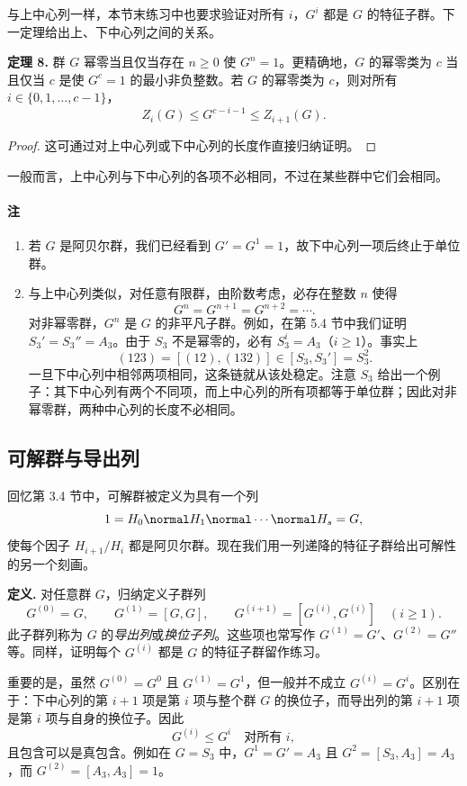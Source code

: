 与上中心列一样，本节末练习中也要求验证对所有 $i$，$G^i$ 都是 $G$ 的特征子群。下一定理给出上、下中心列之间的关系。

\medskip
\noindent\textbf{定理 8.} 群 $G$ 幂零当且仅当存在 $n\geq 0$ 使 $G^n=1$。更精确地，$G$ 的幂零类为 $c$ 当且仅当 $c$ 是使 $G^c=1$ 的最小非负整数。若 $G$ 的幂零类为 $c$，则对所有 $i\in\{0,1,\ldots,c-1\}$，
\[
  Z_i(G)\leq G^{c-i-1}\leq Z_{i+1}(G).
\]

\begin{proof}
这可通过对上中心列或下中心列的长度作直接归纳证明。
\end{proof}

一般而言，上中心列与下中心列的各项不必相同，不过在某些群中它们会相同。

\paragraph{注}
\begin{enumerate}[label=(\arabic*)]
  \item 若 $G$ 是阿贝尔群，我们已经看到 $G'=G^1=1$，故下中心列一项后终止于单位群。
  \item 与上中心列类似，对任意有限群，由阶数考虑，必存在整数 $n$ 使得
  \[
    G^n=G^{n+1}=G^{n+2}=\cdots.
  \]
  对非幂零群，$G^n$ 是 $G$ 的非平凡子群。例如，在第 5.4 节中我们证明 $S_3'=S_3''=A_3$。由于 $S_3$ 不是幂零的，必有 $S_3^i=A_3$（$i\geq 1$）。事实上
  \[
    (123)=[(12),(132)]\in [S_3,S_3']=S_3^2.
  \]
  一旦下中心列中相邻两项相同，这条链就从该处稳定。注意 $S_3$ 给出一个例子：其下中心列有两个不同项，而上中心列的所有项都等于单位群；因此对非幂零群，两种中心列的长度不必相同。
\end{enumerate}

\subsection*{可解群与导出列}

回忆第 3.4 节中，可解群被定义为具有一个列
\[
  1=H_0\normal H_1\normal\cdots\normal H_s=G,
\]
使每个因子 $H_{i+1}/H_i$ 都是阿贝尔群。现在我们用一列递降的特征子群给出可解性的另一个刻画。

\medskip
\noindent\textbf{定义.} 对任意群 $G$，归纳定义子群列
\[
  G^{(0)}=G,
  \qquad
  G^{(1)}=[G,G],
  \qquad
  G^{(i+1)}=[G^{(i)},G^{(i)}]\quad(i\geq 1).
\]
此子群列称为 $G$ 的\emph{导出列}或\emph{换位子列}。这些项也常写作 $G^{(1)}=G'$、$G^{(2)}=G''$ 等。同样，证明每个 $G^{(i)}$ 都是 $G$ 的特征子群留作练习。

重要的是，虽然 $G^{(0)}=G^0$ 且 $G^{(1)}=G^1$，但一般并不成立 $G^{(i)}=G^i$。区别在于：下中心列的第 $i+1$ 项是第 $i$ 项与整个群 $G$ 的换位子，而导出列的第 $i+1$ 项是第 $i$ 项与自身的换位子。因此
\[
  G^{(i)}\leq G^i\quad\text{对所有 }i,
\]
且包含可以是真包含。例如在 $G=S_3$ 中，$G^1=G'=A_3$ 且 $G^2=[S_3,A_3]=A_3$，而 $G^{(2)}=[A_3,A_3]=1$。

